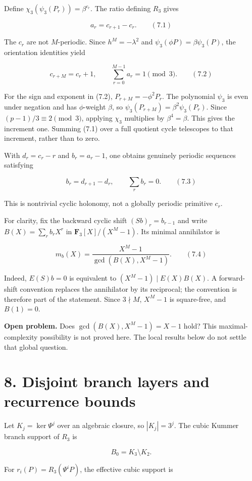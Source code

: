 \documentclass[
  11pt,
  a4paper,
]{article}
\begin{document}
Define \(\chi_3(\psi_3(P_r))=\beta^{c_r}\). The ratio defining \(R_3\)
gives

\[
a_r=c_{r+1}-c_r. \qquad (7.1)
\]

The \(c_r\) are not \(M\)-periodic. Since \(h^M=-\lambda^2\) and
\(\psi_3(\phi P)=\beta\psi_3(P)\), the orientation identities yield

\[
c_{r+M}=c_r+1,\qquad \sum_{r=0}^{M-1}a_r=1\pmod3. \qquad (7.2)
\]

For the sign and exponent in (7.2), \(P_{r+M}=-\phi^2P_r\). The
polynomial \(\psi_3\) is even under negation and has \(\phi\)-weight
\(\beta\), so \(\psi_3(P_{r+M})=\beta^2\psi_3(P_r)\). Since
\((p-1)/3\equiv2\pmod3\), applying \(\chi_3\) multiplies by
\(\beta^{4}=\beta\). This gives the increment one. Summing (7.1) over a
full quotient cycle telescopes to that increment, rather than to zero.

With \(d_r=c_r-r\) and \(b_r=a_r-1\), one obtains genuinely periodic
sequences satisfying

\[
b_r=d_{r+1}-d_r,\qquad \sum_rb_r=0. \qquad (7.3)
\]

This is nontrivial cyclic holonomy, not a globally periodic primitive
\(c_r\).

For clarity, fix the backward cyclic shift \((Sb)_r=b_{r-1}\) and write
\(B(X)=\sum_rb_rX^r\) in \(\mathbf F_3[X]/(X^M-1)\). Its minimal
annihilator is

\[
m_b(X)=\frac{X^M-1}{\gcd(B(X),X^M-1)}. \qquad (7.4)
\]

Indeed, \(E(S)b=0\) is equivalent to \((X^M-1)\mid E(X)B(X)\). A
forward-shift convention replaces the annihilator by its reciprocal; the
convention is therefore part of the statement. Since \(3\nmid M\),
\(X^M-1\) is square-free, and \(B(1)=0\).

\textbf{Open problem.} Does \(\gcd(B(X),X^M-1)=X-1\) hold? This
maximal-complexity possibility is not proved here. The local results
below do not settle that global question.

\section{8. Disjoint branch layers and recurrence
bounds}\label{disjoint-branch-layers-and-recurrence-bounds}

Let \(K_j=\ker\Psi^j\) over an algebraic closure, so \(|K_j|=3^j\). The
cubic Kummer branch support of \(R_3\) is

\[
B_0=K_3\setminus K_2.
\]

For \(r_i(P)=R_3(\Psi^iP)\), the effective cubic support is
\end{document}
